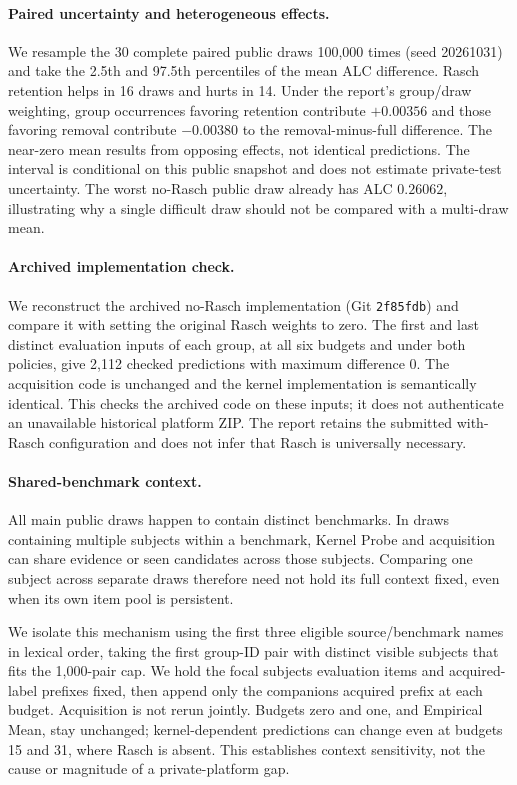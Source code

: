 \paragraph{Paired uncertainty and heterogeneous effects.} We resample the 30 complete paired public draws 100,000 times (seed 20261031) and take the 2.5th and 97.5th percentiles of the mean ALC difference. Rasch retention helps in 16 draws and hurts in 14. Under the report's group/draw weighting, group occurrences favoring retention contribute $+0.00356$ and those favoring removal contribute $-0.00380$ to the removal-minus-full difference. The near-zero mean results from opposing effects, not identical predictions. The interval is conditional on this public snapshot and does not estimate private-test uncertainty. The worst no-Rasch public draw already has ALC $0.26062$, illustrating why a single difficult draw should not be compared with a multi-draw mean.

\paragraph{Archived implementation check.} We reconstruct the archived no-Rasch implementation (Git \texttt{2f85fdb}) and compare it with setting the original Rasch weights to zero. The first and last distinct evaluation inputs of each group, at all six budgets and under both policies, give 2,112 checked predictions with maximum difference $0$. The acquisition code is unchanged and the kernel implementation is semantically identical. This checks the archived code on these inputs; it does not authenticate an unavailable historical platform ZIP. The report retains the submitted with-Rasch configuration and does not infer that Rasch is universally necessary.

\paragraph{Shared-benchmark context.} All main public draws happen to contain distinct benchmarks. In draws containing multiple subjects within a benchmark, Kernel Probe and acquisition can share evidence or seen candidates across those subjects. Comparing one subject across separate draws therefore need not hold its full context fixed, even when its own item pool is persistent.

We isolate this mechanism using the first three eligible source/benchmark names in lexical order, taking the first group-ID pair with distinct visible subjects that fits the 1,000-pair cap. We hold the focal subject\textquotesingle s evaluation items and acquired-label prefixes fixed, then append only the companion\textquotesingle s acquired prefix at each budget. Acquisition is not rerun jointly. Budgets zero and one, and Empirical Mean, stay unchanged; kernel-dependent predictions can change even at budgets 15 and 31, where Rasch is absent. This establishes context sensitivity, not the cause or magnitude of a private-platform gap.

